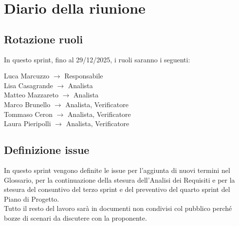 \section{Diario della riunione}
\subsection{Rotazione ruoli}
In questo sprint, fino al 29/12/2025, i ruoli saranno i seguenti: \\
\begin{center}
	Luca Marcuzzo $\rightarrow$ Responsabile \\
	Lisa Casagrande $\rightarrow$ Analista \\
	Matteo Mazzareto $\rightarrow$ Analista \\
	Marco Brunello $\rightarrow$ Analista, Verificatore \\
	Tommaso Ceron $\rightarrow$ Analista, Verificatore \\
	Laura Pieripolli $\rightarrow$ Analista, Verificatore \\
\end{center}

\subsection{Definizione issue}
In questo sprint vengono definite le issue per l'aggiunta di nuovi termini nel Glossario, per la continuazione della stesura dell'Analisi dei Requisiti e per la stesura del consuntivo del terzo sprint e del preventivo del quarto sprint del Piano di Progetto. \\
Tutto il resto del lavoro sarà in documenti non condivisi col pubblico perché bozze di scenari da discutere con la proponente.
